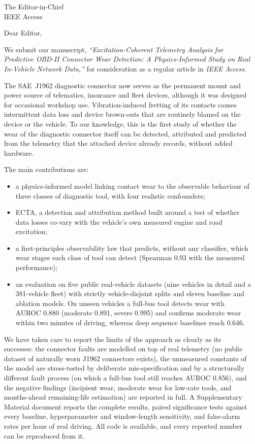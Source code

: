 \documentclass[11pt]{letter}
\begin{document}
\begin{letter}{The Editor-in-Chief\\IEEE Access}
\opening{Dear Editor,}

We submit our manuscript, \emph{``Excitation-Coherent Telemetry Analysis for
Predictive OBD-II Connector Wear Detection: A Physics-Informed Study on Real
In-Vehicle Network Data,''} for consideration as a regular article in
\emph{IEEE Access}.

The SAE~J1962 diagnostic connector now serves as the permanent mount and
power source of telematics, insurance and fleet devices, although it was
designed for occasional workshop use. Vibration-induced fretting of its
contacts causes intermittent data loss and device brown-outs that are
routinely blamed on the device or the vehicle. To our knowledge, this is
the first study of whether the wear of the diagnostic connector itself can
be detected, attributed and predicted from the telemetry that the attached
device already records, without added hardware.

The main contributions are:
\begin{itemize}
\item a physics-informed model linking contact wear to the observable
  behaviour of three classes of diagnostic tool, with four realistic
  confounders;
\item ECTA, a detection and attribution method built around a test of
  whether data losses co-vary with the vehicle's own measured engine and road
  excitation;
\item a first-principles observability law that predicts, without any
  classifier, which wear stages each class of tool can detect (Spearman
  0.93 with the measured performance);
\item an evaluation on five public real-vehicle datasets (nine vehicles in
  detail and a 381-vehicle fleet) with strictly vehicle-disjoint splits and
  eleven baseline and ablation models. On unseen vehicles a full-bus tool
  detects wear with AUROC 0.880 (moderate 0.891, severe 0.995) and confirms
  moderate wear within two minutes of driving, whereas deep sequence
  baselines reach 0.646.
\end{itemize}

We have taken care to report the limits of the approach as clearly as its
successes: the connector faults are modelled on top of real telemetry (no
public dataset of naturally worn J1962 connectors exists), the unmeasured
constants of the model are stress-tested by deliberate mis-specification
and by a structurally different fault process (on which a full-bus tool
still reaches AUROC 0.856),
and the negative findings (incipient wear, moderate wear for low-rate
tools, and months-ahead remaining-life estimation) are reported in full.
A Supplementary Material document reports the complete results, paired
significance tests against every baseline, hyperparameter and window-length
sensitivity, and false-alarm rates per hour of real driving. All code is
available, and every reported number can be reproduced from it.


\end{letter}
\end{document}
